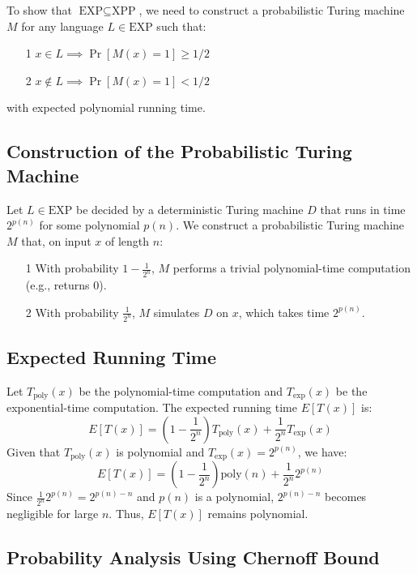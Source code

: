 \documentclass{article}
\begin{document}
To show that \(\text{EXP} \subseteq \text{XPP}\), we need to construct a probabilistic Turing machine \(M\) for any language \(L \in \text{EXP}\) such that:
\begin{itemize}
    \item[1] \(x \in L \implies \Pr[M(x) = 1] \geq 1/2\)
    \item[2] \(x \not\in L \implies \Pr[M(x) = 1] < 1/2\)
\end{itemize}



with expected polynomial running time.

\subsection*{Construction of the Probabilistic Turing Machine}

Let \(L \in \text{EXP}\) be decided by a deterministic Turing machine \(D\) that runs in time \(2^{p(n)}\) for some polynomial \(p(n)\). We construct a probabilistic Turing machine \(M\) that, on input \(x\) of length \(n\):
\begin{itemize}
    \item[1] With probability \(1 - \frac{1}{2^n}\), \(M\) performs a trivial polynomial-time computation (e.g., returns 0).
    \item[2] With probability \(\frac{1}{2^n}\), \(M\) simulates \(D\) on \(x\), which takes time \(2^{p(n)}\).
\end{itemize}



\subsection*{Expected Running Time}

Let \(T_{\text{poly}}(x)\) be the polynomial-time computation and \(T_{\text{exp}}(x)\) be the exponential-time computation. The expected running time \(E[T(x)]\) is:
\[
E[T(x)] = \left(1 - \frac{1}{2^n}\right) T_{\text{poly}}(x) + \frac{1}{2^n} T_{\text{exp}}(x)
\]
Given that \(T_{\text{poly}}(x)\) is polynomial and \(T_{\text{exp}}(x) = 2^{p(n)}\), we have:
\[
E[T(x)] = \left(1 - \frac{1}{2^n}\right) \text{poly}(n) + \frac{1}{2^n} 2^{p(n)}
\]
Since \(\frac{1}{2^n} 2^{p(n)} = 2^{p(n) - n}\) and \(p(n)\) is a polynomial, \(2^{p(n) - n}\) becomes negligible for large \(n\). Thus, \(E[T(x)]\) remains polynomial.

\subsection*{Probability Analysis Using Chernoff Bound}
\end{document}
